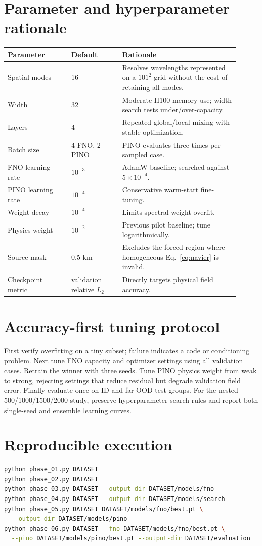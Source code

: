\documentclass[11pt]{article}
\begin{document}
\section{Parameter and hyperparameter rationale}
\begin{longtable}{p{0.25\linewidth}p{0.2\linewidth}p{0.46\linewidth}}
\toprule Parameter & Default & Rationale\\\midrule
Spatial modes & 16 & Resolves wavelengths represented on a $101^2$ grid without the cost of retaining all modes.\\
Width & 32 & Moderate H100 memory use; width search tests under/over-capacity.\\
Layers & 4 & Repeated global/local mixing with stable optimization.\\
Batch size & 4 FNO, 2 PINO & PINO evaluates three times per sampled case.\\
FNO learning rate & $10^{-3}$ & AdamW baseline; searched against $5\times10^{-4}$.\\
PINO learning rate & $10^{-4}$ & Conservative warm-start fine-tuning.\\
Weight decay & $10^{-4}$ & Limits spectral-weight overfit.\\
Physics weight & $10^{-2}$ & Previous pilot baseline; tune logarithmically.\\
Source mask & 0.5 km & Excludes the forced region where homogeneous Eq.~\eqref{eq:navier} is invalid.\\
Checkpoint metric & validation relative $L_2$ & Directly targets physical field accuracy.\\
\bottomrule
\end{longtable}

\section{Accuracy-first tuning protocol}
First verify overfitting on a tiny subset; failure indicates a code or conditioning
problem.  Next tune FNO capacity and optimizer settings using all validation cases.
Retrain the winner with three seeds.  Tune PINO physics weight from weak to strong,
rejecting settings that reduce residual but degrade validation field error.  Finally
evaluate once on ID and far-OOD test groups.  For the nested 500/1000/1500/2000
study, preserve hyperparameter-search rules and report both single-seed and ensemble
learning curves.

\section{Reproducible execution}
\begin{lstlisting}[language=bash]
python phase_01.py DATASET
python phase_02.py DATASET
python phase_03.py DATASET --output-dir DATASET/models/fno
python phase_04.py DATASET --output-dir DATASET/models/search
python phase_05.py DATASET DATASET/models/fno/best.pt \
  --output-dir DATASET/models/pino
python phase_06.py DATASET --fno DATASET/models/fno/best.pt \
  --pino DATASET/models/pino/best.pt --output-dir DATASET/evaluation
\end{lstlisting}
\end{document}
